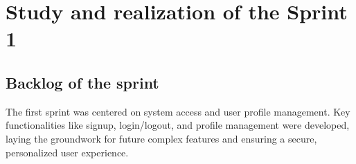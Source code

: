 \chapter{Study and realization of the Sprint 1}
\minitoc
\newpage


\setcounter{secnumdepth}{2} %
\section{Backlog of the sprint}
The first sprint was centered on system access and user profile management. Key functionalities like signup, login/logout, and profile management were developed, laying the groundwork for future complex features and ensuring a secure, personalized user experience.


